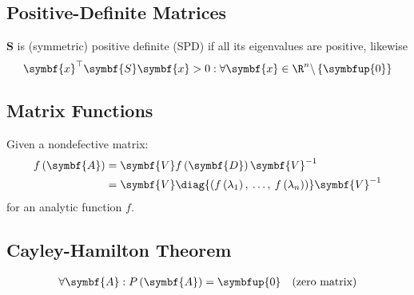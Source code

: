 \documentclass{article}
\begin{document}
\begin{multicols*}{3}
    \subsection{Positive-Definite Matrices}
    \(\symbf{S}\) is (symmetric) positive definite (SPD) if all its eigenvalues are positive, likewise
    \begin{equation*}
        \symbf{x}^\top \symbf{S} \symbf{x} > 0 : \forall \symbf{x} \in \R^n \backslash \left\{ \symbfup{0} \right\}
    \end{equation*}
    \subsection{Matrix Functions}
    Given a nondefective matrix:
    \begin{align*}
        f\left( \symbf{A} \right) & = \symbf{V} f\left( \symbf{D} \right) \symbf{V}^{-1}                                                               \\
                                  & = \symbf{V} \diag{\left( f\left( \lambda_1 \right),\: \ldots,\: f\left( \lambda_n \right) \right)} \symbf{V}^{-1}
    \end{align*}
    for an analytic function \(f\).
    \subsection{Cayley-Hamilton Theorem}
    \begin{align*}
        \forall \symbf{A} : P\left( \symbf{A} \right) = \symbfup{0} &  & \text{(zero matrix)}
    \end{align*}

\end{multicols*}
\end{document}
